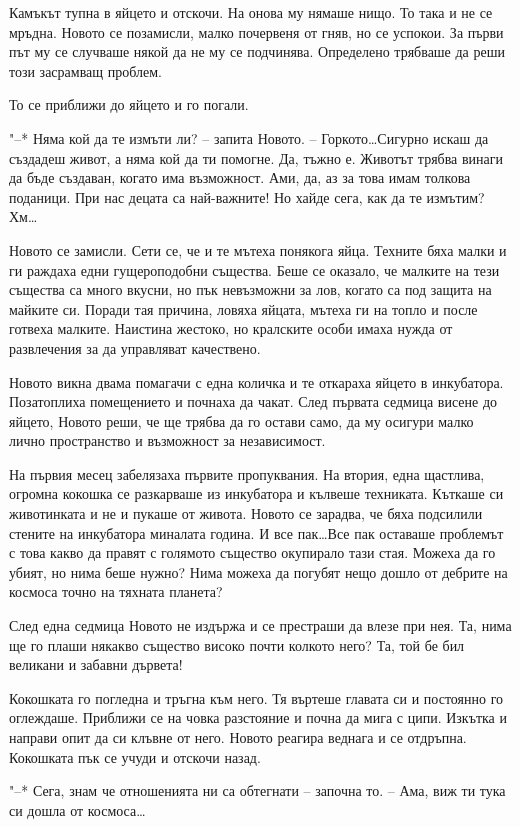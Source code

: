 \documentclass[ebook,openany,12pt]{memoir}
\begin{document}
Камъкът тупна в яйцето и отскочи. На онова му нямаше нищо. То така и не се мръдна. Новото се позамисли, малко почервеня от гняв, но се успокои. За първи път му се случваше някой да не му се подчинява. Определено трябваше да реши този засрамващ проблем.

То се приближи до яйцето и го погали.

"--* Няма кой да те измъти ли? – запита Новото. – Горкото\ldots Сигурно искаш да създадеш живот, а няма кой да ти помогне. Да, тъжно е. Животът трябва винаги да бъде създаван, когато има възможност. Ами, да, аз за това имам толкова поданици. При нас децата са най-важните! Но хайде сега, как да те измътим? Хм\ldots

Новото се замисли. Сети се, че и те мътеха понякога яйца. Техните бяха малки и ги раждаха едни гущероподобни същества. Беше се оказало, че малките на тези същества са много вкусни, но пък невъзможни за лов, когато са под защита на майките си. Поради тая причина, ловяха яйцата, мътеха ги на топло и после готвеха малките. Наистина жестоко, но кралските особи имаха нужда от развлечения за да управляват качествено.

Новото викна двама помагачи с една количка и те откараха яйцето в инкубатора. Позатоплиха помещението и почнаха да чакат. След първата седмица висене до яйцето, Новото реши, че ще трябва да го остави само, да му осигури малко лично пространство и възможност за независимост.

На първия месец забелязаха първите пропуквания. На втория, една щастлива, огромна кокошка се разкарваше из инкубатора и кълвеше техниката. Къткаше си животинката и не и пукаше от живота. Новото се зарадва, че бяха подсилили стените на инкубатора миналата година. И все пак\ldots Все пак оставаше проблемът с това какво да правят с голямото същество окупирало тази стая. Можеха да го убият, но нима беше нужно? Нима можеха да погубят нещо дошло от дебрите на космоса точно на тяхната планета?

След една седмица Новото не издържа и се престраши да влезе при нея. Та, нима ще го плаши някакво същество високо почти колкото него? Та, той бе бил великани и забавни дървета!

Кокошката го погледна и тръгна към него. Тя въртеше главата си и постоянно го оглеждаше. Приближи се на човка разстояние и почна да мига с ципи. Изкътка и направи опит да си клъвне от него. Новото реагира веднага и се отдръпна. Кокошката пък се учуди и отскочи назад.

"--* Сега, знам че отношенията ни са обтегнати – започна то. – Ама, виж ти тука си дошла от космоса\ldots
\end{document}
